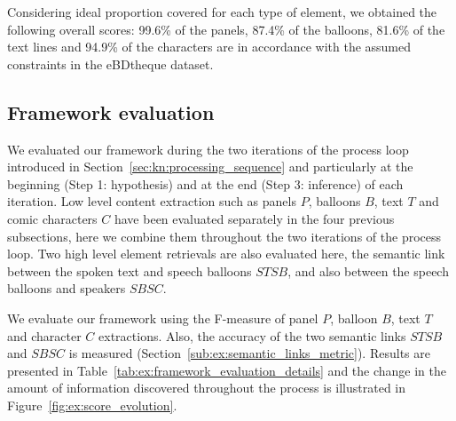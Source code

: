Considering ideal proportion covered for each type of element, we obtained the following overall scores: 99.6\% of the panels, 87.4\% of the balloons, 81.6\% of the text lines and 94.9\% of the characters are in accordance with the assumed constraints in the eBDtheque dataset.
%

\subsection{Framework evaluation}
We evaluated our framework during the two iterations of the process loop introduced in Section~\ref{sec:kn:processing_sequence} and particularly at the beginning (Step 1: hypothesis) and at the end (Step 3: inference) of each iteration.
Low level content extraction such as panels $P$, balloons $B$, text $T$ and comic characters $C$ have been evaluated separately in the four previous subsections, here we combine them throughout the two iterations of the process loop.
Two high level element retrievals are also evaluated here, the semantic link between the spoken text and speech balloons $STSB$, and also between the speech balloons and speakers $SBSC$.

We evaluate our framework using the F-measure of panel $P$, balloon $B$, text $T$ and character $C$ extractions.
Also, the accuracy of the two semantic links $STSB$ and $SBSC$ is measured (Section~\ref{sub:ex:semantic_links_metric}).
Results are presented in Table~\ref{tab:ex:framework_evaluation_details} and the change in the amount of information discovered throughout the process is illustrated in Figure~\ref{fig:ex:score_evolution}.



